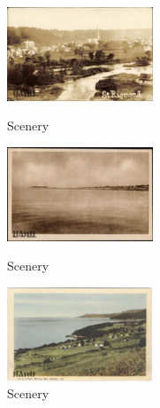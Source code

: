 \documentclass[hidelinks,12pt,a4paper]{report}
\begin{document}
\begin{figure}[!htb]
  \includegraphics[height=2.8cm, left]{images/sample/scenery_111}
  \captionsetup{labelformat=empty}
  \caption{Scenery}
\endminipage\hfill
{}
  \includegraphics[height=2.8cm, center]{images/sample/scenery_102}
  \captionsetup{labelformat=empty}
  \caption{Scenery}
\endminipage\hfill
{}%
  \includegraphics[height=2.8cm, right]{images/sample/scenery_110}
\captionsetup{labelformat=empty}
  \caption{Scenery}
\endminipage
\end{figure}
\end{document}
